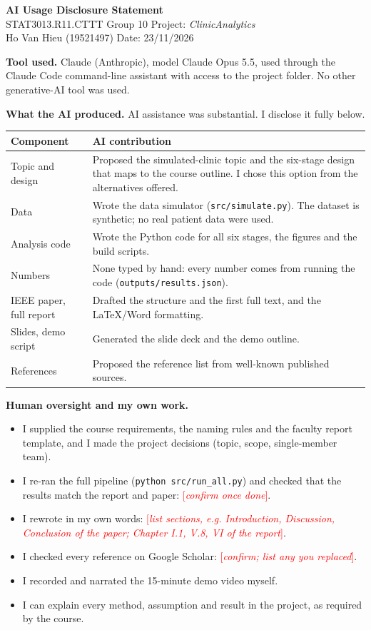 \documentclass[11pt,a4paper]{article}
\newcommand{\todo}[1]{\textcolor{red}{[\textit{#1}]}}
\begin{document}
\sloppy
\begin{center}
{\Large\bfseries AI Usage Disclosure Statement}\\[3pt]
STAT3013.R11.CTTT \quad Group 10 \quad Project: \textit{ClinicAnalytics}\\
Ho Van Hieu (19521497) \quad Date: 23/11/2026
\end{center}

\noindent\textbf{Tool used.} Claude (Anthropic), model Claude Opus 5.5, used through the Claude Code command-line assistant with access to the project folder. No other generative-AI tool was used.

\medskip\noindent\textbf{What the AI produced.} AI assistance was substantial. I disclose it fully below.

\smallskip
\begin{tabularx}{\linewidth}{@{}p{3.6cm}X@{}}
\toprule
\textbf{Component} & \textbf{AI contribution}\\
\midrule
Topic and design & Proposed the simulated-clinic topic and the six-stage design that maps to the course outline. I chose this option from the alternatives offered. \\
Data & Wrote the data simulator (\texttt{src/simulate.py}). The dataset is synthetic; no real patient data were used. \\
Analysis code & Wrote the Python code for all six stages, the figures and the build scripts. \\
Numbers & None typed by hand: every number comes from running the code (\texttt{outputs/results.json}). \\
IEEE paper, full report & Drafted the structure and the first full text, and the LaTeX/Word formatting. \\
Slides, demo script & Generated the slide deck and the demo outline. \\
References & Proposed the reference list from well-known published sources. \\
\bottomrule
\end{tabularx}

\medskip\noindent\textbf{Human oversight and my own work.}
\begin{itemize}
\item I supplied the course requirements, the naming rules and the faculty report template, and I made the project decisions (topic, scope, single-member team).
\item I re-ran the full pipeline (\texttt{python src/run\_all.py}) and checked that the results match the report and paper: \todo{confirm once done}.
\item I rewrote in my own words: \todo{list sections, e.g. Introduction, Discussion, Conclusion of the paper; Chapter I.1, V.8, VI of the report}.
\item I checked every reference on Google Scholar: \todo{confirm; list any you replaced}.
\item I recorded and narrated the 15-minute demo video myself.
\item I can explain every method, assumption and result in the project, as required by the course.
\end{itemize}
\end{document}
